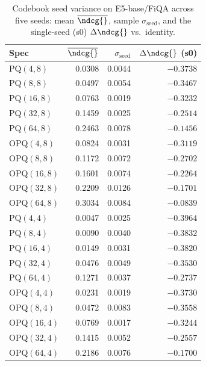 \begin{table}[t]
\centering
\small
\caption{Codebook seed variance on E5-base/FiQA across five seeds: mean $\overline{\ndcg{}}$, sample $\sigma_{\text{seed}}$, and the single-seed (s0) $\Delta\ndcg{}$ vs.\ identity.}
\label{tab:seed-variance-e5-base-fiqa}
\begin{tabular}{lrrr}
\toprule
Spec & $\overline{\ndcg{}}$ & $\sigma_{\text{seed}}$ & $\Delta\ndcg{}$ (s0) \\
\midrule
PQ$(4,8)$ & 0.0308 & 0.0044 & $-0.3738$ \\
PQ$(8,8)$ & 0.0497 & 0.0054 & $-0.3467$ \\
PQ$(16,8)$ & 0.0763 & 0.0019 & $-0.3232$ \\
PQ$(32,8)$ & 0.1459 & 0.0025 & $-0.2514$ \\
PQ$(64,8)$ & 0.2463 & 0.0078 & $-0.1456$ \\
OPQ$(4,8)$ & 0.0824 & 0.0031 & $-0.3119$ \\
OPQ$(8,8)$ & 0.1172 & 0.0072 & $-0.2702$ \\
OPQ$(16,8)$ & 0.1601 & 0.0074 & $-0.2264$ \\
OPQ$(32,8)$ & 0.2209 & 0.0126 & $-0.1701$ \\
OPQ$(64,8)$ & 0.3034 & 0.0084 & $-0.0839$ \\
PQ$(4,4)$ & 0.0047 & 0.0025 & $-0.3964$ \\
PQ$(8,4)$ & 0.0090 & 0.0040 & $-0.3832$ \\
PQ$(16,4)$ & 0.0149 & 0.0031 & $-0.3820$ \\
PQ$(32,4)$ & 0.0476 & 0.0049 & $-0.3530$ \\
PQ$(64,4)$ & 0.1271 & 0.0037 & $-0.2737$ \\
OPQ$(4,4)$ & 0.0231 & 0.0019 & $-0.3730$ \\
OPQ$(8,4)$ & 0.0472 & 0.0083 & $-0.3558$ \\
OPQ$(16,4)$ & 0.0769 & 0.0017 & $-0.3244$ \\
OPQ$(32,4)$ & 0.1415 & 0.0052 & $-0.2557$ \\
OPQ$(64,4)$ & 0.2186 & 0.0076 & $-0.1700$ \\
\bottomrule
\end{tabular}
\end{table}

